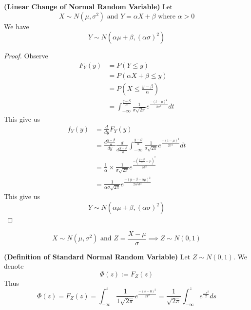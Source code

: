 \documentclass{report}
\begin{document}
\begin{theorem}
\label{2.3.12}
\textbf{(Linear Change of Normal Random Variable)} Let 
\begin{equation}
X\sim N(\mu,\sigma^2)\text{ and }Y=\alpha X+\beta \text{ where  }\alpha >0
\end{equation}
We have
\begin{equation}
Y\sim N(\alpha \mu+\beta , (\alpha \sigma)^2)
\end{equation}
\end{theorem}
\begin{proof}
Observe
\begin{align}
F_Y(y)&=P(Y\leq y)\\
&=P(\alpha X+\beta \leq y)\\
&=P(X\leq \frac{y-\beta }{\alpha })\\
&=\int_{-\infty}^{\frac{y-\beta }{\alpha }} \frac{1}{\sigma \sqrt{2\pi} }e^{\frac{-(t-\mu)^2}{2\sigma^2}}dt
\end{align}
This give us
\begin{align}
f_Y(y)&=\frac{d}{dy}F_Y(y)\\
&=\frac{d \frac{y-\beta }{\alpha }}{dy}\frac{d}{d\frac{y-\beta }{\alpha }}\int_{-\infty}^{\frac{y-\beta }{\alpha }}\frac{1}{\sigma \sqrt{2\pi} }e^{\frac{-(t-\mu)^2}{2\sigma^2}}dt\\
&=\frac{1}{\alpha }\times \frac{1}{\sigma \sqrt{2\pi} }e^{\frac{-(\frac{y-\beta }{\alpha }-\mu)^2}{2\sigma^2}}\\
&=\frac{1}{\alpha \sigma \sqrt{2\pi} }e^{\frac{-(y-\beta -\alpha \mu)^2}{2\alpha ^2\sigma^2}}
\end{align}
This give us
\begin{equation}
Y\sim N(\alpha \mu+\beta , (\alpha \sigma)^2)
\end{equation}
\end{proof}
\begin{corollary}
\label{2.3.13}
\begin{equation}
X\sim N(\mu,\sigma^2)\text{ and }Z=\frac{X-\mu}{\sigma}\implies Z\sim N(0,1)
\end{equation}
\end{corollary}
\begin{definition}
\label{2.3.14}
\textbf{(Definition of Standard Normal Random Variable)} Let $Z\sim N(0,1)$. We denote
\begin{equation}
\Phi(z):=F_Z(z)
\end{equation}
Thus
\begin{equation}
\Phi(z)=F_Z(z)=\int_{-\infty}^z \frac{1}{1\sqrt{2\pi} }e^{\frac{-(s-0)^2}{2 1^2}}= \frac{1}{\sqrt{2\pi} }\int_{-\infty}^z e^{\frac{-s^2}{2}}ds
\end{equation}
\end{definition}
\end{document}
